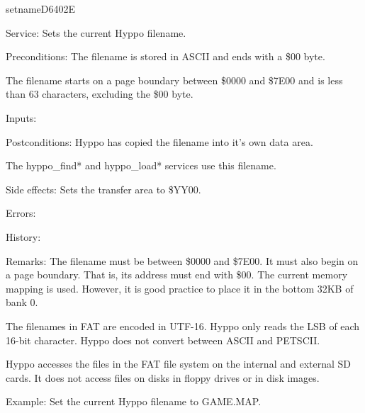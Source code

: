 \newpage
\begin{hyppotrap}{setname}{D640}{2E}
\item [Service:]
  Sets the current Hyppo filename.
\item [Preconditions:]
  The filename is stored in ASCII and ends with a \$00 byte.

  The filename starts on a page boundary between \$0000 and \$7E00 and is less
  than 63 characters, excluding the \$00 byte.
\item [Inputs:]
\item [Postconditions:]
  Hyppo has copied the filename into it's own data area.

  The hyppo\_find* and hyppo\_load* services use this filename.
\item [Side effects:]
  Sets the transfer area to \$YY00.
\item [Errors:]
\item [History:]
\item [Remarks:]
  The filename must be between \$0000 and \$7E00. It must also begin on a
  page boundary. That is, its address must end with \$00. The current memory
  mapping is used. However, it is good practice to place it in the bottom 32KB
  of bank 0.

  The filenames in FAT are encoded in UTF-16. Hyppo only reads the LSB
  of each 16-bit character. Hyppo does not convert between ASCII and
  PETSCII.

  Hyppo accesses the files in the FAT file system on the internal and
  external SD cards. It does not access files on disks in floppy drives or in
  disk images.
\item [Example:]
  Set the current Hyppo filename to GAME.MAP.
\end{hyppotrap}


